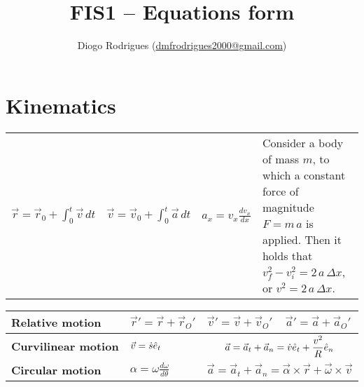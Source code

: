 \documentclass{form}
\author{Diogo Rodrigues (\href{mailto:dmfrodrigues2000@gmail.com}{dmfrodrigues2000@gmail.com})}
\title{FIS1 -- Equations form}
\begin{document}
\section*{Kinematics}
\begin{center} \begin{tabular}{c | c | c | p{115mm}}
    $\displaystyle \vec{r} = \vec{r}_0 + \int_0^t{\vec{v}\,dt}$ &
    $\displaystyle \vec{v} = \vec{v}_0 + \int_0^t{\vec{a}\,dt}$ &
    $\displaystyle a_x = v_x \frac{dv_x}{dx}$ &
    Consider a body of mass $m$, to which a constant force of magnitude $F=m\,a$ is applied. Then it holds that $v_f^2 - v_i^2 = 2\,a\,\Delta x$, or $v^2 = 2\,a\,\Delta x$.
\end{tabular} \end{center}

\begin{center}
    \setlength\extrarowheight{9pt}
    \begin{tabular}{p{50mm} | P{44mm} | P{44mm} | P{44mm}}
        \textbf{Relative motion} & $\vec{r}' = \vec{r} + \vec{r}_O'$ & $\vec{v}' = \vec{v} + \vec{v}_O'$ & $\vec{a}' = \vec{a} + \vec{a}_O'$ \\[7pt] \hline
        \textbf{Curvilinear motion} & $\vec{v} = \dot{s} \hat{e}_t$ &  \\[7pt] \hline
        \textbf{Circular motion} & $\displaystyle \alpha = \omega \frac{d\omega}{d\theta}$ &  \\[7pt]
    \end{tabular}
\end{center}
\end{document}
